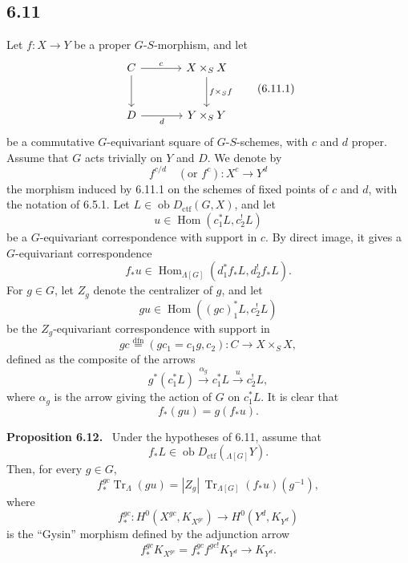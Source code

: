 \documentclass[11pt]{article}
\newenvironment{statement}[1]{\par\medskip\noindent\textbf{#1.}\ }{\par\medskip}
\DeclareMathOperator{\Hom}{Hom}
\providecommand{\Tr}{\operatorname{Tr}}
\providecommand{\Tr}{\operatorname{Tr}}
\providecommand{\Ob}{\operatorname{ob}}
\providecommand{\Tr}{\operatorname{Tr}}
\providecommand{\Hom}{\operatorname{Hom}}
\providecommand{\Ob}{\operatorname{ob}}
\providecommand{\Tr}{\operatorname{Tr}}
\providecommand{\Ob}{\operatorname{Ob}}
\providecommand{\Hom}{\operatorname{Hom}}
\providecommand{\Tr}{\operatorname{Tr}}
\providecommand{\Ob}{\operatorname{ob}}
\providecommand{\Ob}{\operatorname{Ob}}
\begin{document}
\subsection*{6.11}
Let $f:X\to Y$ be a proper $G$-$S$-morphism, and let
\begin{equation}
\begin{tikzcd}[column sep=large,row sep=large]
C \arrow[r,"c"] \arrow[d] & X\times_SX \arrow[d,"f\times_Sf"]\\
D \arrow[r,"d"'] & Y\times_SY
\end{tikzcd}
\tag{6.11.1}
\end{equation}
be a commutative $G$-equivariant square of $G$-$S$-schemes, with $c$ and $d$ proper. Assume that $G$ acts trivially on $Y$ and $D$. We denote by
\begin{equation}
f^{c/d}\quad(\text{or } f^c):X^c\longrightarrow Y^d
\tag{6.11.2}
\end{equation}
the morphism induced by 6.11.1 on the schemes of fixed points of $c$ and $d$, with the notation of 6.5.1. Let $L\in\Ob D_{\mathrm{ctf}}(G,X)$, and let
\[
u\in\Hom(c_1^*L,c_2^!L)
\]
be a $G$-equivariant correspondence with support in $c$. By direct image, it gives a $G$-equivariant correspondence
\[
f_*u\in\Hom_{\Lambda[G]}(d_1^*f_*L,d_2^!f_*L).
\]
For $g\in G$, let $Z_g$ denote the centralizer of $g$, and let
\begin{equation}
gu\in\Hom((gc)_1^*L,c_2^!L)
\tag{6.11.3}
\end{equation}
be the $Z_g$-equivariant correspondence with support in
\begin{equation}
gc\stackrel{\mathrm{dfn}}{=}(gc_1=c_1g,c_2):C\to X\times_SX,
\tag{6.11.4}
\end{equation}
defined as the composite of the arrows
\[
g^*(c_1^*L)\xrightarrow{\alpha_g}c_1^*L\xrightarrow{u}c_2^!L,
\]
where $\alpha_g$ is the arrow giving the action of $G$ on $c_1^*L$. It is clear that
\begin{equation}
f_*(gu)=g(f_*u).
\tag{6.11.5}
\end{equation}

\begin{statement}{Proposition 6.12}
Under the hypotheses of 6.11, assume that
\[
f_*L\in\Ob D_{\mathrm{ctf}}({}_{\Lambda[G]}Y).
\]
Then, for every $g\in G$,
\begin{equation}
f_*^{gc}\Tr_{\Lambda}(gu)
=
|Z_g|\,\Tr_{\Lambda[G]}(f_*u)(g^{-1}),
\tag{6.12.1}
\end{equation}
where
\[
f_*^{gc}:H^0(X^{gc},K_{X^{gc}})\longrightarrow H^0(Y^d,K_{Y^d})
\]
is the ``Gysin'' morphism defined by the adjunction arrow
\[
f_*^{gc}K_{X^{gc}}=f_*^{gc}f^{gc!}K_{Y^d}\longrightarrow K_{Y^d}.
\]
\end{statement}
\end{document}
